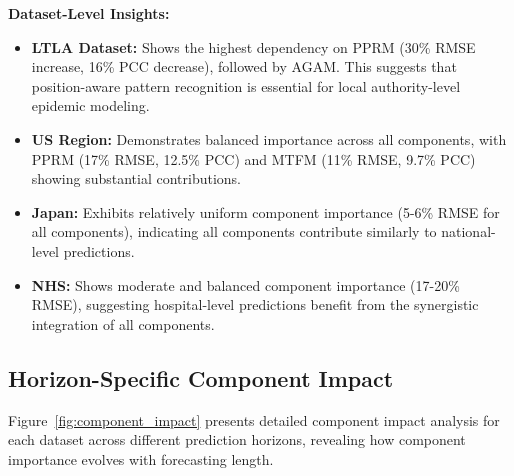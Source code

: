 \documentclass[11pt,a4paper]{article}
\begin{document}
\textbf{Dataset-Level Insights:}
\begin{itemize}
    \item \textbf{LTLA Dataset:} Shows the highest dependency on PPRM (30\% RMSE increase, 16\% PCC decrease), followed by AGAM. This suggests that position-aware pattern recognition is essential for local authority-level epidemic modeling.
    
    \item \textbf{US Region:} Demonstrates balanced importance across all components, with PPRM (17\% RMSE, 12.5\% PCC) and MTFM (11\% RMSE, 9.7\% PCC) showing substantial contributions.
    
    \item \textbf{Japan:} Exhibits relatively uniform component importance (5-6\% RMSE for all components), indicating all components contribute similarly to national-level predictions.
    
    \item \textbf{NHS:} Shows moderate and balanced component importance (17-20\% RMSE), suggesting hospital-level predictions benefit from the synergistic integration of all components.
\end{itemize}

\subsection{Horizon-Specific Component Impact}

Figure~\ref{fig:component_impact} presents detailed component impact analysis for each dataset across different prediction horizons, revealing how component importance evolves with forecasting length.
\end{document}

